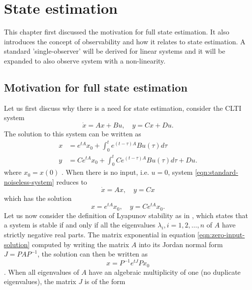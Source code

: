 \section{State estimation}\label{ch:state-estimation}
This chapter first discussed the motivation for full state estimation. It also introduces the concept of observability and how it relates to state estimation. A standard 'single-observer' will be derived for linear systems and it will be expanded to also observe system with a non-linearity.


\subsection{Motivation for full state estimation}
Let us first discuss why there is a need for state estimation, consider the CLTI system
\begin{equation}\label{eqn:standard-noiseless-system}
    \dot{x} = Ax + Bu, \quad y = Cx + Du.
\end{equation}
The solution to this system can be written as
\begin{equation*}
    \begin{split}
        x &= e^{tA}x_{0} + \int_{0}^{t}e^{(t-\tau)A}Bu(\tau)d\tau \\
        y &= Ce^{tA}x_{0} + \int_{0}^{t}Ce^{(t-\tau)A}Bu(\tau)d\tau + Du.
    \end{split}
\end{equation*}
where $x_0 = x(0)$ \cite[Eqn. 6.4]{Hespanha2018LinearTheory}. When there is no input, i.e. $u=0$, system \eqref{eqn:standard-noiseless-system} reduces to
\begin{equation*}
    \dot{x} = Ax, \quad y = Cx
\end{equation*}
which has the solution
\begin{equation}\label{eqn:zero-input-solution}
    x = e^{tA}x_0, \quad y = Ce^{tA}x_0.
\end{equation}
Let us now consider the definition of Lyapunov stability as in \cite[Th. 8.2]{Hespanha2018LinearTheory}, which states that a system is stable if and only if all the eigenvalues $\lambda_i,i=1,2,\dots,n$ of $A$ have strictly negative real parts. The matrix exponential in equation \eqref{eqn:zero-input-solution} computed by writing the matrix $A$ into its Jordan normal form $J=PAP^{-1}$, the solution can then be written as
\begin{equation}\label{eqn:jordan-form-exponential}
    x = P^{-1}e^{tJ}Px_0
\end{equation}
\cite[Section 7.3]{Hespanha2018LinearTheory}. When all eigenvalues of $A$ have an algebraic multiplicity of one (no duplicate eigenvalues), the matrix $J$ is of the form

